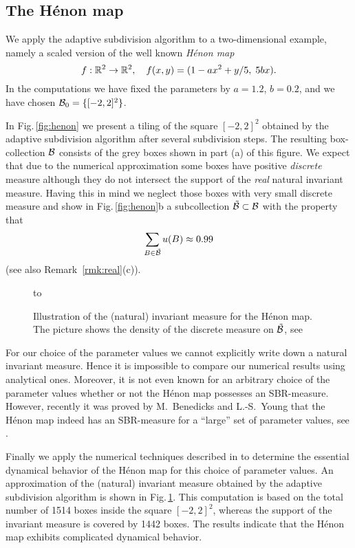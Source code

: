 \documentclass[cvs,envcountsect]{svjour}
\begin{document}
\subsection*{The H\'enon  map}
\label{subsec:henon}
%
We apply the adaptive subdivision algorithm to a two-di\-men\-sio\-nal
example, namely a scaled version of the well known {\em H\'enon map}
\[
f:{\mathbb R}^2\to {\mathbb R}^2,\quad
f(x,y) = (1-ax^2+y/5,\; 5bx).
\]
In the computations we have fixed the parameters by $a=1.2$, $b=0.2$,
and we have chosen $\cB_0=\{[-2,2]^2\}$.

In Fig.\,\ref{fig:henon} we present a tiling of the square $[-2,2]^2$
obtained by the adaptive subdivision algorithm after several subdivision
steps. The resulting box-collection $\cB$ consists of the
grey boxes shown in part (a) of this figure.
We expect that due to the numerical approximation some boxes have
positive {\em discrete\/} measure although they do not intersect the
support of the {\em real\/} natural invariant measure.
Having this in mind we neglect those boxes with very small discrete
measure and show in Fig.\,\ref{fig:henon}b a subcollection
$\tilde\cB\subset\cB$ with the property that
\begin{equation}
\label{eq:dm}
\sum_{B\in\tilde\cB} u(B) \approx 0.99
\end{equation}
(see also Remark~\ref{rmk:real}(c)).

\begin{figure}
\vbox{\hbox to}
\caption[]{Illustration of the (natural) invariant measure for the
           H\'enon map. The picture shows the density of the discrete
           measure on $\tilde\cB$, see \protect{}}
\label{fig:hen2}
\end{figure}

\begin{remark}
For our choice of the parameter values we cannot explicitly
write down a natural invariant measure.  Hence it is impossible
to compare our numerical results using analytical ones.
Moreover, it is not even known for an arbitrary choice of the parameter
values whether or not the H\'enon map possesses an SBR-measure.
However, recently it was proved by M.\ Benedicks and L.-S.\ Young that
the H\'enon map indeed has an SBR-measure for a
``large'' set of parameter values, see \cite{BenYoung}.
\end{remark}


Finally we apply the numerical techniques described in
\cite{DJ:96} to determine the essential dynamical behavior of the
H\'enon map for this choice of parameter values.  An approximation
of the (natural) invariant measure obtained by the adaptive
subdivision algorithm is shown in Fig.\,\ref{fig:hen2}.  This
computation is based on the total number of 1514 boxes inside the
square $[-2,2]^2$, whereas the support of the
invariant measure is covered by 1442 boxes.
The results indicate that the H\'enon map exhibits complicated dynamical
behavior.
\end{document}
